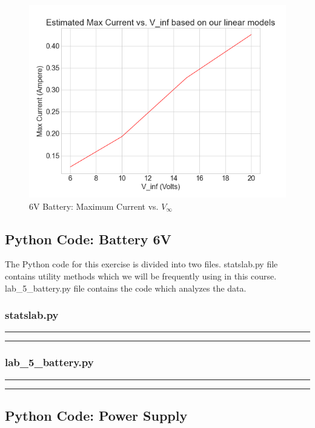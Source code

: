 \documentclass[letterpaper,12pt]{article}
\begin{document}
\begin{figure}[H]
  \centering
  \includegraphics[width=0.95\linewidth]{../code/Fredrik/Estimated Max Current vs. V_inf based on our linear models.png}    
  \caption{6V Battery: Maximum Current vs. $V_{\infty}$ }
  \label{ps-max-c}
\end{figure}

\pagebreak

\subsection{Python Code: Battery 6V}

The Python code for this exercise is divided into two files. statslab.py file contains utility methods
which we will be frequently using in this course. lab\_5\_battery.py file contains the code which analyzes
the data.

\subsubsection{statslab.py}
\noindent\rule{\textwidth}{1pt}

\noindent\rule{\textwidth}{1pt}

\pagebreak

\subsubsection{lab\_5\_battery.py}
\noindent\rule{\textwidth}{1pt}

\noindent\rule{\textwidth}{1pt}

\pagebreak

\subsection{Python Code: Power Supply}
\end{document}
